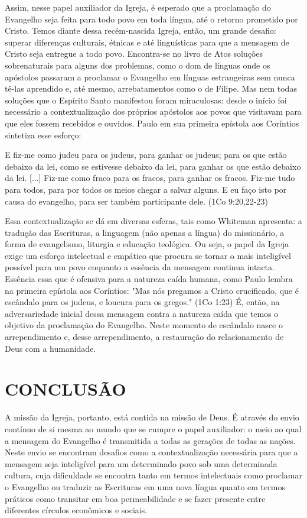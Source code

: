 \documentclass[
    article,            %
	12pt,				%
	oneside,			%
	a4paper,			%
	chapter=TITLE,		%
	section=TITLE,		%
	english,			%
	french,				%
	spanish,			%
	brazil				%
	]{abntex2}
\begin{document}
Assim, nesse papel auxiliador da Igreja, é esperado que a proclamação do Evangelho seja feita para todo povo em toda língua, até o retorno prometido por Cristo. Temos diante dessa recém-nascida Igreja, então, um grande desafio: superar diferenças culturais, étnicas e até linguísticas para que a mensagem de Cristo seja entregue a todo povo. Encontra-se no livro de Atos soluções sobrenaturais para alguns dos problemas, como o dom de línguas onde os apóstolos passaram a proclamar o Evangelho em línguas estrangeiras sem nunca tê-las aprendido e, até mesmo, arrebatamentos como o de Filipe. Mas nem todas soluções que o Espírito Santo manifestou foram miraculosas: desde o início foi necessário a contextualização dos próprios apóstolos aos povos que visitavam para que eles fossem recebidos e ouvidos. Paulo em sua primeira epístola aos Coríntios sintetiza esse esforço:
\begin{citacao}
E fiz-me como judeu para os judeus, para ganhar os judeus; para os que estão debaixo da lei, como se estivesse debaixo da lei, para ganhar os que estão debaixo da lei. [...] Fiz-me como fraco para os fracos, para ganhar os fracos. Fiz-me tudo para todos, para por todos os meios chegar a salvar alguns. E eu faço isto por causa do evangelho, para ser também participante dele. (1Co 9:20,22-23)
\end{citacao}

Essa contextualização se dá em diversas esferas, tais como Whiteman apresenta: a tradução das Escrituras, a linguagem (não apenas a língua) do missionário, a forma de evangelismo, liturgia e educação teológica. Ou seja, o papel da Igreja exige um esforço intelectual e empático que procura se tornar o mais inteligível possível para um povo enquanto a essência da mensagem continua intacta. Essência essa que é ofensiva para a natureza caída humana, como Paulo lembra na primeira epístola aos Coríntios: "Mas nós pregamos a Cristo crucificado, que é escândalo para os judeus, e loucura para os gregos." (1Co 1:23) É, então, na adversariedade inicial dessa mensagem contra a natureza caída que temos o objetivo da proclamação do Evangelho. Neste momento de escândalo nasce o arrependimento e, desse arrependimento, a restauração do relacionamento de Deus com a humanidade.

\section{CONCLUSÃO}
A missão da Igreja, portanto, está contida na missão de Deus. É através do envio contínuo de si mesma ao mundo que se cumpre o papel auxiliador: o meio ao qual a mensagem do Evangelho é transmitida a todas as gerações de todas as nações. Neste envio se encontram desafios como a contextualização necessária para que a mensagem seja inteligível para um determinado povo sob uma determinada cultura, cuja dificuldade se encontra tanto em termos intelectuais como proclamar o Evangelho ou traduzir as Escrituras em uma nova língua quanto em termos práticos como transitar em boa permeabilidade e se fazer presente entre diferentes círculos econômicos e sociais.
\end{document}
